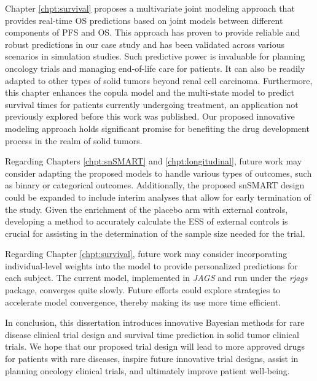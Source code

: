 Chapter \ref{chpt:survival} proposes a multivariate joint modeling approach that provides real-time \ac{OS} predictions based on joint models between different components of \ac{PFS} and \ac{OS}. This approach has proven to provide reliable and robust predictions in our case study and has been validated across various scenarios in simulation studies. Such predictive power is invaluable for planning oncology trials and managing end-of-life care for patients. It can also be readily adapted to other types of solid tumors beyond renal cell carcinoma. Furthermore, this chapter enhances the copula model and the multi-state model to predict survival times for patients currently undergoing treatment, an application not previously explored before this work was published. Our proposed innovative modeling approach holds significant promise for benefiting the drug development process in the realm of solid tumors.


Regarding Chapters \ref{chpt:snSMART} and \ref{chpt:longitudinal}, future work may consider adapting the proposed models to handle various types of outcomes, such as binary or categorical outcomes. Additionally, the proposed \ac{snSMART} design could be expanded to include interim analyses that allow for early termination of the study. Given the enrichment of the placebo arm with external controls, developing a method to accurately calculate the \ac{ESS} of external controls is crucial for assisting in the determination of the sample size needed for the trial.

Regarding Chapter \ref{chpt:survival}, future work may consider incorporating individual-level weights into the model to provide personalized predictions for each subject. The current model, implemented in \textit{JAGS} and run under the \textit{rjags} package, converges quite slowly. Future efforts could explore strategies to accelerate model convergence, thereby making its use more time efficient.

In conclusion, this dissertation introduces innovative Bayesian methods for rare disease clinical trial design and survival time prediction in solid tumor clinical trials. We hope that our proposed trial design will lead to more approved drugs for patients with rare diseases, inspire future innovative trial designs, assist in planning oncology clinical trials, and ultimately improve patient well-being.



